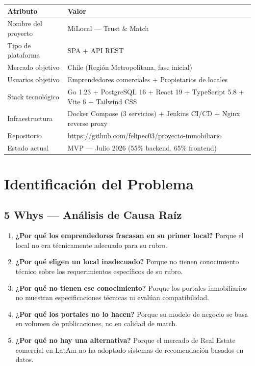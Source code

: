 \documentclass[11pt,a4paper]{article}
\begin{document}
\vspace{0.5cm}
\begin{table}[H]
    \centering
    \renewcommand{\arraystretch}{1.3}
    \begin{tabularx}{\textwidth}{>{\hsize=0.3\hsize}X >{\hsize=0.7\hsize}X}
        \toprule
        \textbf{Atributo} & \textbf{Valor} \\
        \midrule
        Nombre del proyecto & MiLocal — Trust \& Match \\
        Tipo de plataforma & SPA + API REST \\
        Mercado objetivo & Chile (Región Metropolitana, fase inicial) \\
        Usuarios objetivo & Emprendedores comerciales + Propietarios de locales \\
        Stack tecnológico & Go 1.23 + PostgreSQL 16 + React 19 + TypeScript 5.8 + Vite 6 + Tailwind CSS \\
        Infraestructura & Docker Compose (3 servicios) + Jenkins CI/CD + Nginx reverse proxy \\
        Repositorio & \url{https://github.com/felipec03/proyecto-inmobiliario} \\
        Estado actual & MVP — Julio 2026 (55\% backend, 65\% frontend) \\
        \bottomrule
    \end{tabularx}
\end{table}

\section{Identificación del Problema}

\subsection{5 Whys — Análisis de Causa Raíz}

\begin{enumerate}
    \item \textbf{¿Por qué los emprendedores fracasan en su primer local?} Porque el local no era técnicamente adecuado para su rubro.
    \item \textbf{¿Por qué eligen un local inadecuado?} Porque no tienen conocimiento técnico sobre los requerimientos específicos de su rubro.
    \item \textbf{¿Por qué no tienen ese conocimiento?} Porque los portales inmobiliarios no muestran especificaciones técnicas ni evalúan compatibilidad.
    \item \textbf{¿Por qué los portales no lo hacen?} Porque su modelo de negocio se basa en volumen de publicaciones, no en calidad de match.
    \item \textbf{¿Por qué no hay una alternativa?} Porque el mercado de Real Estate comercial en LatAm no ha adoptado sistemas de recomendación basados en datos.
\end{enumerate}
\end{document}
